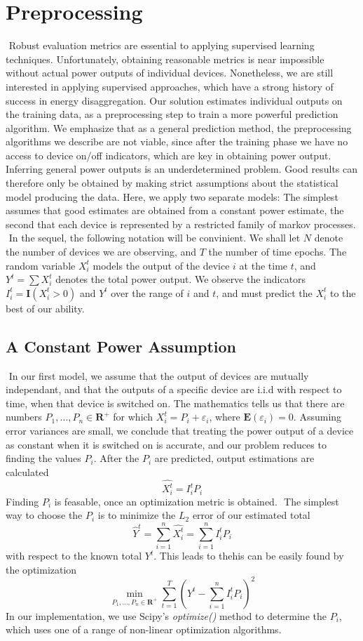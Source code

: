 \documentclass{article}
\begin{document}
\section{Preprocessing}
​
Robust evaluation metrics are essential to applying supervised learning techniques. Unfortunately, obtaining reasonable metrics is near impossible without actual power outputs of individual devices. Nonetheless, we are still interested in applying supervised approaches, which have a strong history of success in energy disaggregation. Our solution estimates individual outputs on the training data, as a preprocessing step to train a more powerful prediction algorithm. We emphasize that as a general prediction method, the preprocessing algorithms we describe are not viable, since after the training phase we have no access to device on/off indicators, which are key in obtaining power output.
​
Inferring general power outputs is an underdetermined problem. Good results can therefore only be obtained by making strict assumptions about the statistical model producing the data. Here, we apply two separate models: The simplest assumes that good estimates are obtained from a constant power estimate, the second that each device is represented by a restricted family of markov processes.
​
In the sequel, the following notation will be convinient. We shall let $N$ denote the number of devices we are observing, and $T$ the number of time epochs. The random variable $X_i^t$ models the output of the device $i$ at the time $t$, and $Y^t = \sum X_i^t$ denotes the total power output. We observe the indicators $I_i^t = \mathbf{I}(X_i^t > 0)$ and $Y^t$ over the range of $i$ and $t$, and must predict the $X_i^t$ to the best of our ability.
​
\subsection{A Constant Power Assumption}
​
In our first model, we assume that the output of devices are mutually independant, and that the outputs of a specific device are i.i.d with respect to time, when that device is switched on. The mathematics tells us that there are numbers $P_1, \dots, P_n \in \mathbf{R}^+$ for which $X_i^t = P_i + \varepsilon_i$, where $\mathbf{E}(\varepsilon_i) = 0$. Assuming error variances are small, we conclude that treating the power output of a device as constant when it is switched on is accurate, and our problem reduces to finding the values $P_i$. After the $P_i$ are predicted, output estimations are calculated
%
\[ \hat{X_i^t} = I_i^t P_i \]
%
Finding $P_i$ is feasable, once an optimization metric is obtained.
​
The simplest way to choose the $P_i$ is to minimize the $L_2$ error of our estimated total
%
\[ \hat{Y}^t = \sum_{i = 1}^n \hat{X_i^t} = \sum_{i = 1}^n I_i^t P_i \]
%
with respect to the known total $Y^t$. This leads to thehis can be easily found by the optimization
%
\[ \min_{P_1, \dots, P_n \in \mathbf{R}^+} \sum_{t = 1}^T \left( Y^t - \sum_{i = 1}^n I_i^t P_i \right)^2 \]
%
In our implementation, we use Scipy's {\it optimize()} method to determine the $P_i$, which uses one of a range of non-linear optimization algorithms.
​
\end{document}

